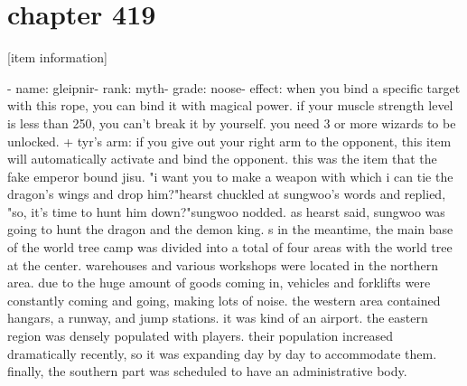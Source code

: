 \section{chapter 419}

[item information]




- name: gleipnir- rank: myth- grade: noose- effect: when you bind a specific target with this rope, you can bind it with magical power.
 if your muscle strength level is less than 250, you can't break it by yourself.
 you need 3 or more wizards to be unlocked.
+ tyr's arm: if you give out your right arm to the opponent, this item will automatically activate and bind the opponent.
this was the item that the fake emperor bound jisu.
"i want you to make a weapon with which i can tie the dragon's wings and drop him?"hearst chuckled at sungwoo's words and replied, "so, it's time to hunt him down?"sungwoo nodded.
 as hearst said, sungwoo was going to hunt the dragon and the demon king.
 s in the meantime, the main base of the world tree camp was divided into a total of four areas with the world tree at the center.
warehouses and various workshops were located in the northern area.
 due to the huge amount of goods coming in, vehicles and forklifts were constantly coming and going, making lots of noise.
 the western area contained hangars, a runway, and jump stations.
 it was kind of an airport.
 the eastern region was densely populated with players.
 their population increased dramatically recently, so it was expanding day by day to accommodate them.
 finally, the southern part was scheduled to have an administrative body.

